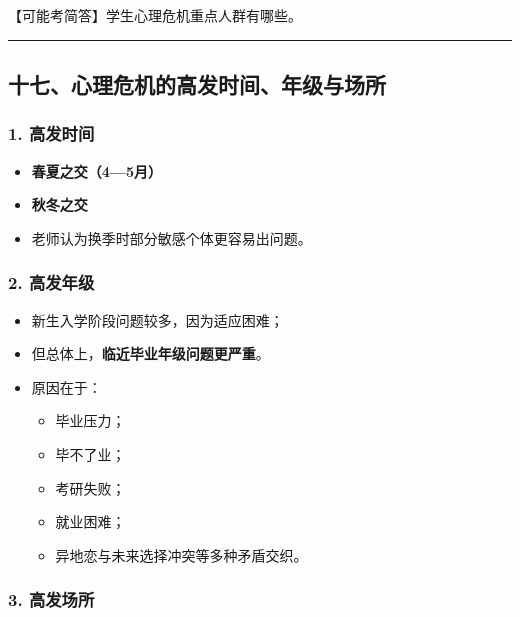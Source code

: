 \documentclass[
  chinese,
  9pt,
  a4paper,
]{ctexart}
\providecommand{\tightlist}{%
  \setlength{\itemsep}{0pt}\setlength{\parskip}{0pt}}
\begin{document}
【可能考简答】学生心理危机重点人群有哪些。

\begin{center}\rule{0.5\linewidth}{0.5pt}\end{center}

\subsection{十七、心理危机的高发时间、年级与场所}\label{ux5341ux4e03ux5fc3ux7406ux5371ux673aux7684ux9ad8ux53d1ux65f6ux95f4ux5e74ux7ea7ux4e0eux573aux6240}

\subsubsection{1. 高发时间}\label{ux9ad8ux53d1ux65f6ux95f4}

\begin{itemize}
\tightlist
\item
  \textbf{春夏之交（4---5月）}
\item
  \textbf{秋冬之交}
\item
  老师认为换季时部分敏感个体更容易出问题。
\end{itemize}

\subsubsection{2. 高发年级}\label{ux9ad8ux53d1ux5e74ux7ea7}

\begin{itemize}
\item
  新生入学阶段问题较多，因为适应困难；
\item
  但总体上，\textbf{临近毕业年级问题更严重}。
\item
  原因在于：

  \begin{itemize}
  \tightlist
  \item
    毕业压力；
  \item
    毕不了业；
  \item
    考研失败；
  \item
    就业困难；
  \item
    异地恋与未来选择冲突等多种矛盾交织。
  \end{itemize}
\end{itemize}

\subsubsection{3. 高发场所}\label{ux9ad8ux53d1ux573aux6240}
\end{document}
